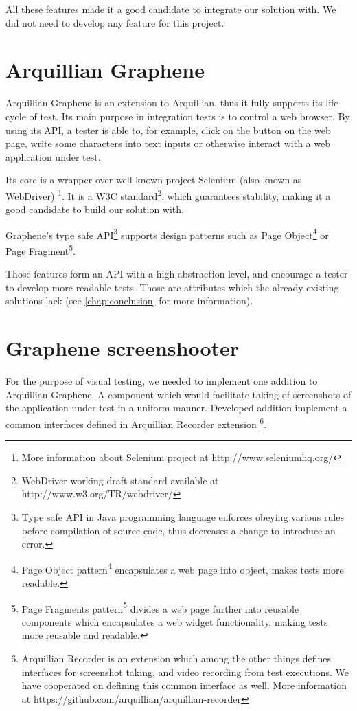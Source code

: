\documentclass[11pt,oneside,final]{fithesis2}
\begin{document}
All these features made it a good candidate to integrate our solution with. We did not need to develop any
feature for this project.
  
\section{Arquillian Graphene}
Arquillian Graphene is an extension to Arquillian, thus it fully supports its life cycle of test. Its main
purpose in integration tests is to control a web browser. By using its API, a tester is able to, for example,
click on the button on the web page, write some characters into text inputs or otherwise interact with
a web application under test.

Its core is a wrapper over well known project Selenium (also known as WebDriver) 
\footnote{More information about Selenium project at http://www.seleniumhq.org/}. It is a W3C 
standard\footnote{WebDriver working draft standard available at http://www.w3.org/TR/webdriver/},
which guarantees stability, making it a good candidate to build our solution with.

Graphene's type safe API\footnote{Type safe API in Java programming language enforces obeying various rules
before compilation of source code, thus decreases a change to introduce an error.} supports design patterns
such as Page Object\footnote{Page Object pattern\footnote{Page Object patter - \url{https://code.google.com/p/selenium/wiki/PageObjects}} encapsulates a web page into object, makes tests
more readable.} or Page Fragment\footnote{Page Fragments pattern\footnote{Page Fragments pattern - \url{https://docs.jboss.org/author/display/ARQGRA2/Page+Fragments}} divides a web page further into reusable 
components which encapsulates a web widget functionality, making tests more reusable and readable.}.

Those features form an API with a high abstraction level, and encourage a tester to develop more readable
tests. Those are attributes which the already existing solutions lack (see \ref{chap:conclusion} for more
information).

\section{Graphene screenshooter}
For the purpose of visual testing, we needed to implement one addition to Arquillian Graphene. 
A component which would facilitate taking of screenshots of the application under test in a uniform manner.
Developed addition implement a common interfaces defined in Arquillian Recorder extension
\footnote{Arquillian Recorder is an extension which among the other things defines interfaces 
for screenshot taking, and video recording from test executions. We have cooperated on defining this
common interface as well. More information at https://github.com/arquillian/arquillian-recorder}.
\end{document}
